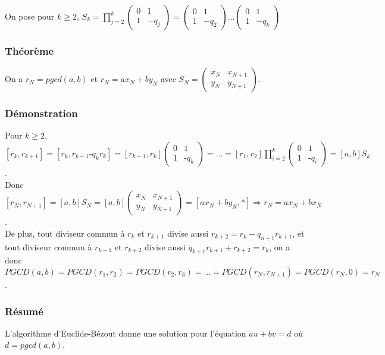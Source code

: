 \documentclass[a4paper,10pt]{book} %
\begin{document}
On pose pour $k\geq 2$, $\displaystyle S_k=\prod_{j=2}^k\begin{pmatrix}
0 & 1 \\ 1 & -q_j
\end{pmatrix}=\begin{pmatrix}
0 & 1 \\ 1 & -q_2
\end{pmatrix}...\begin{pmatrix}
0 & 1 \\ 1 & -q_k
\end{pmatrix}$

\subsubsection{Théorème}
On a $r_N=pgcd(a,b)$ et $r_N=ax_N+by_N$ avec $S_N=\begin{pmatrix}
x_N & x_{N+1} \\ y_N & y_{N+1}
\end{pmatrix}$.

\subsubsection{Démonstration}
\begingroup\setlength{\arraycolsep}{2pt}\small Pour $k\geq 2$, $\displaystyle[r_k,r_{k+1}]=[r_k,r_{k-1}\text{-}q_kr_k]=[r_{k-1},r_k]\begin{pmatrix}
0 & 1 \\ 1 & \text{-}q_k
\end{pmatrix}=...=[r_1,r_2]\prod_{i=2}^k\begin{pmatrix}
0 & 1 \\ 1 & \text{-}q_i
\end{pmatrix}=[a,b] S_k$.\endgroup\\

Donc $[r_N,r_{N+1}]=[a,b]S_N=[a,b]\begin{pmatrix}
x_N & x_{N+1} \\ y_N & y_{N+1}
\end{pmatrix}=[ax_N+by_N,*] \Rightarrow r_N=ax_N+bx_N$.\\

De plus, tout diviseur commun à $r_k$ et $r_{k+1}$ divise aussi $r_{k+2}=r_k-q_{n+1}r_{k+1}$, et tout diviseur commun à $r_{k+1}$ et $r_{k+2}$ divise aussi $q_{k+1}r_{k+1}+r_{k+2}=r_k$, on a donc\\
$PGCD(a,b)=PGCD(r_1,r_2)=PGCD(r_2,r_3)=...=PGCD(r_N,r_{N+1})=PGCD(r_N,0)=r_N$.

\subsubsection{Résumé}
L'algorithme d'Euclide-Bézout donne une solution pour l'équation $au+bv=d$ où $d=pgcd(a,b)$.\\
\end{document}
